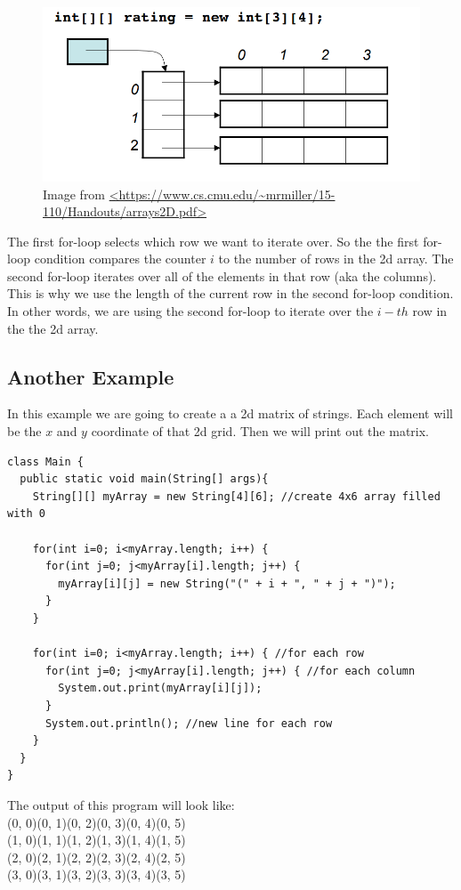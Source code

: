 \documentclass[11]{article}
\begin{document}
\begin{figure}[H]
	\centering
	\includegraphics[scale=0.4]{2darray.png}
	\caption{Image from \url{<https://www.cs.cmu.edu/~mrmiller/15-110/Handouts/arrays2D.pdf>}}
\end{figure}

The first for-loop selects which row we want to iterate over. So the the first for-loop condition compares the counter $i$ to the number of rows in the 2d array. The second for-loop iterates over all of the elements in that row (aka the columns). This is why we use the length of the current row in the second for-loop condition. In other words, we are using the second for-loop to iterate over the $i-th$ row in the the 2d array.

\subsection{Another Example}
In this example we are going to create a a 2d matrix of strings. Each element will be the $x$ and $y$ coordinate of that 2d grid. Then we will print out the matrix.

\begin{lstlisting}
class Main {
  public static void main(String[] args){
    String[][] myArray = new String[4][6]; //create 4x6 array filled with 0

    for(int i=0; i<myArray.length; i++) {
      for(int j=0; j<myArray[i].length; j++) {
        myArray[i][j] = new String("(" + i + ", " + j + ")");
      }
    }

    for(int i=0; i<myArray.length; i++) { //for each row
      for(int j=0; j<myArray[i].length; j++) { //for each column
        System.out.print(myArray[i][j]);
      }
      System.out.println(); //new line for each row
    } 
  }
}
\end{lstlisting}

The output of this program will look like:\\
(0, 0)(0, 1)(0, 2)(0, 3)(0, 4)(0, 5)\\(1, 0)(1, 1)(1, 2)(1, 3)(1, 4)(1, 5)\\(2, 0)(2, 1)(2, 2)(2, 3)(2, 4)(2, 5)\\(3, 0)(3, 1)(3, 2)(3, 3)(3, 4)(3, 5)\\
\end{document}
